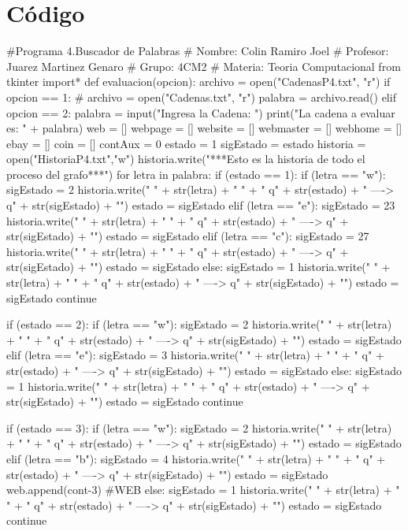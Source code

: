 \documentclass{article}
\begin{document}
	\section*{Código}
	\begin{python}
		#Programa 4.Buscador de Palabras
		# Nombre: Colin Ramiro Joel
		# Profesor: Juarez Martinez Genaro
		# Grupo: 4CM2
		# Materia: Teoria Computacional
		from tkinter import*
		def evaluacion(opcion):
			archivo = open("CadenasP4.txt", "r") 
			if opcion == 1:
				# archivo = open("Cadenas.txt", "r") 
				palabra = archivo.read()    
			elif opcion == 2:
				palabra = input("Ingresa la Cadena: ")    
			print("La cadena a evaluar es: " + palabra)    
			web = []
			webpage = [] 
			website = []
			webmaster = []
			webhome = []
			ebay = []
			coin = []     
			contAux = 0
			estado = 1
			sigEstado = estado    
			historia = open("HistoriaP4.txt","w")
			historia.write("***Esto es la historia de todo el proceso del grafo***\n\n")
			for letra in palabra:     				        
				if (estado == 1):          
					if (letra == "w"):                
						sigEstado = 2 
						historia.write(" { " + str(letra) + " } " + "  q" + str(estado) + "  ---->  q" + str(sigEstado) + "\n")
						estado = sigEstado           
					elif (letra == "e"):
						sigEstado = 23     
						historia.write(" { " + str(letra) + " } " + "  q" + str(estado) + "  ---->  q" + str(sigEstado) + "\n")
						estado = sigEstado  
					elif (letra == "c"):
						sigEstado = 27
						historia.write(" { " + str(letra) + " } " + "  q" + str(estado) + "  ---->  q" + str(sigEstado) + "\n")
						estado = sigEstado 
					else:
						sigEstado = 1
						historia.write(" { " + str(letra) + " } " + "  q" + str(estado) + "  ---->  q" + str(sigEstado) + "\n")
						estado = sigEstado                    
					continue         
			
				if (estado == 2):
					if (letra == "w"):
						sigEstado = 2
						historia.write(" { " + str(letra) + " } " + "  q" + str(estado) + "  ---->  q" + str(sigEstado) + "\n")
						estado = sigEstado
					elif (letra == "e"): 
						sigEstado = 3
						historia.write(" { " + str(letra) + " } " + "  q" + str(estado) + "  ---->  q" + str(sigEstado) + "\n")
						estado = sigEstado               
					else:
						sigEstado = 1
						historia.write(" { " + str(letra) + " } " + "  q" + str(estado) + "  ---->  q" + str(sigEstado) + "\n")
						estado = sigEstado
					continue
			
				if (estado == 3):
					if (letra == "w"):
						sigEstado = 2   
						historia.write(" { " + str(letra) + " } " + "  q" + str(estado) + "  ---->  q" + str(sigEstado) + "\n")
						estado = sigEstado                              
					elif (letra == "b"): 
						sigEstado = 4
						historia.write(" { " + str(letra) + " } " + "  q" + str(estado) + "  ---->  q" + str(sigEstado) + "\n")
						estado = sigEstado
						web.append(cont-3) #WEB         
					else:
						sigEstado = 1
						historia.write(" { " + str(letra) + " } " + "  q" + str(estado) + "  ---->  q" + str(sigEstado) + "\n")
						estado = sigEstado
					continue
			

\end{python}
\end{document}
